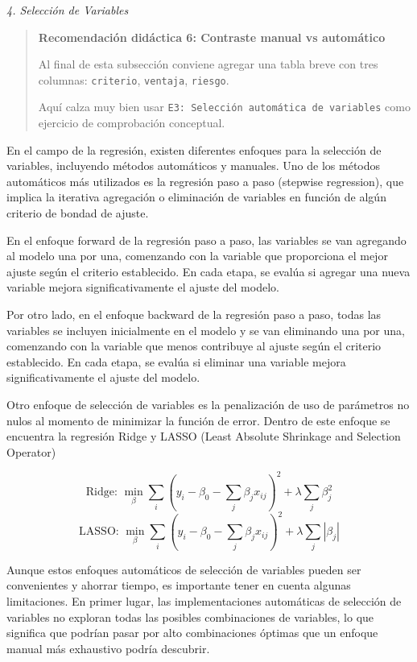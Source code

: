\documentclass[
]{book}
\begin{document}
\emph{4. Selección de Variables}

\begin{quote}
\textbf{Recomendación didáctica 6: Contraste manual vs automático}

Al final de esta subsección conviene agregar una tabla breve con tres
columnas: \texttt{criterio}, \texttt{ventaja}, \texttt{riesgo}.

Aquí calza muy bien usar \texttt{E3:\ Selección\ automática\ de\ variables} como
ejercicio de comprobación conceptual.
\end{quote}

En el campo de la regresión, existen diferentes enfoques para la
selección de variables, incluyendo métodos automáticos y manuales. Uno
de los métodos automáticos más utilizados es la regresión paso a paso
(stepwise regression), que implica la iterativa agregación o eliminación
de variables en función de algún criterio de bondad de ajuste.

En el enfoque forward de la regresión paso a paso, las variables se van
agregando al modelo una por una, comenzando con la variable que
proporciona el mejor ajuste según el criterio establecido. En cada
etapa, se evalúa si agregar una nueva variable mejora significativamente
el ajuste del modelo.

Por otro lado, en el enfoque backward de la regresión paso a paso, todas
las variables se incluyen inicialmente en el modelo y se van eliminando
una por una, comenzando con la variable que menos contribuye al ajuste
según el criterio establecido. En cada etapa, se evalúa si eliminar una
variable mejora significativamente el ajuste del modelo.

Otro enfoque de selección de variables es la penalización de uso de
parámetros no nulos al momento de minimizar la función de error. Dentro
de este enfoque se encuentra la regresión Ridge y LASSO (Least Absolute
Shrinkage and Selection Operator)

\[\text{Ridge: }\min_{β} \sum_{i}(y_i - \beta_0 - \sum_{j}\beta_{j}x_{ij})^2 + λ\sum_{j}\beta_{j}^2\]
\[\text{LASSO: }\min_{β}\sum_{i}(y_i - \beta_0 - \sum_{j}\beta_{j}x_{ij})^2 + λ\sum_{j}|\beta_{j}|\]

Aunque estos enfoques automáticos de selección de variables pueden ser
convenientes y ahorrar tiempo, es importante tener en cuenta algunas
limitaciones. En primer lugar, las implementaciones automáticas de
selección de variables no exploran todas las posibles combinaciones de
variables, lo que significa que podrían pasar por alto combinaciones
óptimas que un enfoque manual más exhaustivo podría descubrir.
\end{document}
